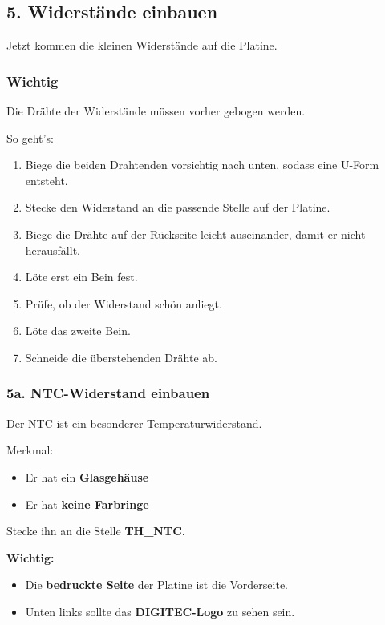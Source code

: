 \documentclass[a4paper,11pt]{article}
\begin{document}
\subsection*{5. Widerstände einbauen}

Jetzt kommen die kleinen Widerstände auf die Platine.

\subsubsection*{Wichtig}
Die Drähte der Widerstände müssen vorher gebogen werden.

So geht’s:
\begin{enumerate}
    \item Biege die beiden Drahtenden vorsichtig nach unten, sodass eine U-Form entsteht.
    \item Stecke den Widerstand an die passende Stelle auf der Platine.
    \item Biege die Drähte auf der Rückseite leicht auseinander, damit er nicht herausfällt.
    \item Löte erst ein Bein fest.
    \item Prüfe, ob der Widerstand schön anliegt.
    \item Löte das zweite Bein.
    \item Schneide die überstehenden Drähte ab.
\end{enumerate}

\subsubsection*{5a. NTC-Widerstand einbauen}

Der NTC ist ein besonderer Temperaturwiderstand.

Merkmal:
\begin{itemize}
    \item Er hat ein \textbf{Glasgehäuse}
    \item Er hat \textbf{keine Farbringe}
\end{itemize}

Stecke ihn an die Stelle \textbf{TH\_NTC}.

\textbf{Wichtig:}
\begin{itemize}
    \item Die \textbf{bedruckte Seite} der Platine ist die Vorderseite.
    \item Unten links sollte das \textbf{DIGITEC-Logo} zu sehen sein.
\end{itemize}
\end{document}
